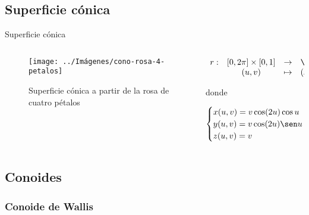 \documentclass[10pt]{beamer}
\begin{document}
	\subsection{Superficie cónica}
	
	\begin{frame}{Superficie cónica}
		\begin{columns}[t] %
			\begin{column}{.50\textwidth}
				\begin{figure}
					\centering
					\texttt{[image: ../Imágenes/cono-rosa-4-petalos]}
					\caption{Superficie cónica a partir de la rosa de cuatro pétalos}
					\label{fig:cono-rosa-4-petalos}
				\end{figure}
			\end{column}%
			\hfill%
			\begin{column}{.50\textwidth}
				$$\begin{array}{rcll}
				r : & [0, 2\pi] \times [0,1] & \to & \R^3\\
				& (u,v) & \mapsto & (x,y,z)
				\end{array}$$
				
				donde 
				
				$$ \begin{cases}
				x(u,v) = v\cos(2u)\cos u \\
				y(u,v) = v\cos(2u) \sen u \\
				z(u,v) = v
				\end{cases} $$
			\end{column}%
		\end{columns}
	\end{frame}
	
	\subsection{Conoides}
	
	\subsubsection{Conoide de Wallis}
	
\end{document}

